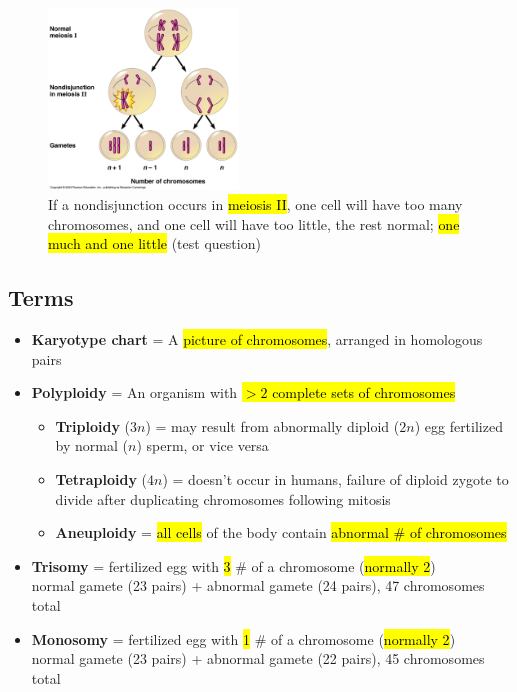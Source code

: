 \documentclass[a4paper,12pt]{article}
\begin{document}
\begin{figure}[H]
    \centering
    \includegraphics[width=0.45\textwidth]{nonj2}
    \caption{If a nondisjunction occurs in \hl{meiosis II}, one cell will have too many chromosomes, and one cell will have too little, the rest normal; \hl{one much and one little} (test question)}
\end{figure}

\subsection{Terms}
\begin{itemize}
    \item{\textbf{Karyotype chart} = A \hl{picture of chromosomes}, arranged in homologous pairs}
    \item{
            \textbf{Polyploidy} = An organism with \hl{$>2$ complete sets of chromosomes}
            \begin{itemize}
                \item{\textbf{Triploidy} ($3n$) = may result from abnormally diploid ($2n$) egg fertilized by normal ($n$) sperm, or vice versa}
                \item{\textbf{Tetraploidy} ($4n$) = doesn't occur in humans, failure of diploid zygote to divide after duplicating chromosomes following mitosis}
                \item{\textbf{Aneuploidy} = \hl{all cells} of the body contain \hl{abnormal \# of chromosomes}}
            \end{itemize}
        }
    \item{\textbf{Trisomy} = fertilized egg with \hl{3} \# of a chromosome (\hl{normally 2}) \\ normal gamete (23 pairs) + abnormal gamete (24 pairs), 47 chromosomes total}
    \item{\textbf{Monosomy} = fertilized egg with \hl{1} \# of a chromosome (\hl{normally 2}) \\ normal gamete (23 pairs) + abnormal gamete (22 pairs), 45 chromosomes total}
\end{itemize}
\end{document}
